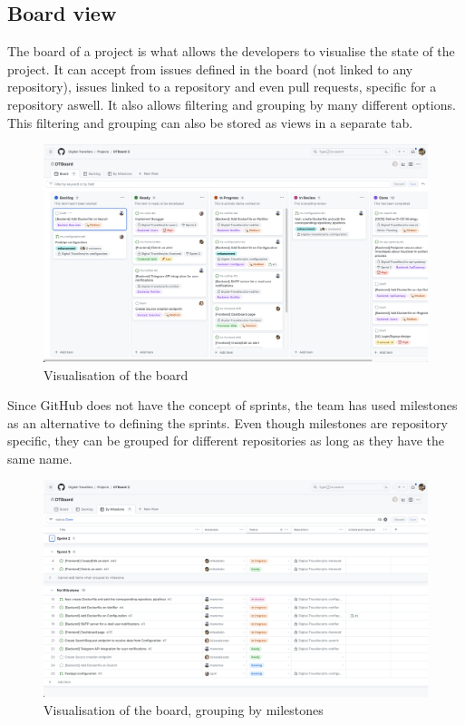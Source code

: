 \documentclass[../memory.tex]{subfiles}
\begin{document}
\subsection{Board view}
The board of a project is what allows the developers to visualise the state of
the project. It can accept from issues defined in the board (not linked to any
repository), issues linked to a repository and even pull requests, specific for
a repository aswell. It also allows filtering and grouping by many different
options. This filtering and grouping can also be stored as views in a separate
tab.
\begin{figure}[H]
	\centering
	\includegraphics[width=\textwidth]{./assets/gh-board.png}
	\caption{Visualisation of the board}
\end{figure}
Since GitHub does not have the concept of sprints, the team has used milestones
as an alternative to defining the sprints. Even though milestones are repository
specific, they can be grouped for different repositories as long as they have
the same name.
\begin{figure}[H]
	\centering
	\includegraphics[width=\textwidth]{./assets/gh-board-milestone.png}
	\caption{Visualisation of the board, grouping by milestones}
\end{figure}
\end{document}
